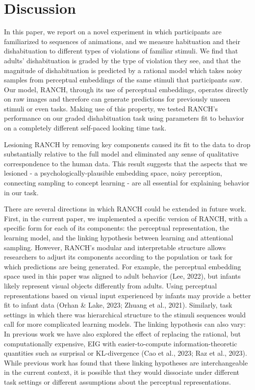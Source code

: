 \documentclass[10pt, letterpaper]{article}
\begin{document}
\hypertarget{discussion}{%
\section{Discussion}\label{discussion}}

In this paper, we report on a novel experiment in which participants are
familiarized to sequences of animations, and we measure habituation and
their dishabituation to different types of violations of familiar
stimuli. We find that adults' dishabituation is graded by the type of
violation they see, and that the magnitude of dishabituation is
predicted by a rational model which takes noisy samples from perceptual
embeddings of the same stimuli that participants saw. Our model, RANCH,
through its use of perceptual embeddings, operates directly on raw
images and therefore can generate predictions for previously unseen
stimuli or even tasks. Making use of this property, we tested RANCH's
performance on our graded dishabituation task using parameters fit to
behavior on a completely different self-paced looking time task.

Lesioning RANCH by removing key components caused its fit to the data to
drop substantially relative to the full model and eliminated any sense
of qualitative correspondence to the human data. This result suggests
that the aspects that we lesioned - a psychologically-plausible
embedding space, noisy perception, connecting sampling to concept
learning - are all essential for explaining behavior in our task.

There are several directions in which RANCH could be extended in future
work. First, in the current paper, we implemented a specific version of
RANCH, with a specific form for each of its components: the perceptual
representation, the learning model, and the linking hypothesis between
learning and attentional sampling. However, RANCH's modular and
interpretable structure allows researchers to adjust its components
according to the population or task for which predictions are being
generated. For example, the perceptual embedding space used in this
paper was aligned to adult behavior (Lee, 2022), but infants likely
represent visual objects differently from adults. Using perceptual
representations based on visual input experienced by infants may provide
a better fit to infant data (Orhan \& Lake, 2023; Zhuang et al., 2021).
Similarly, task settings in which there was hierarchical structure to
the stimuli sequences would call for more complicated learning models.
The linking hypothesis can also vary: In previous work we have also
explored the effect of replacing the rational, but computationally
expensive, EIG with easier-to-compute information-theoretic quantities
such as surprisal or KL-divergence (Cao et al., 2023; Raz et al., 2023).
While previous work has found that these linking hypotheses are
interchangeable in the current context, it is possible that they would
dissociate under different task settings or different assumptions about
the perceptual representations.
\end{document}
